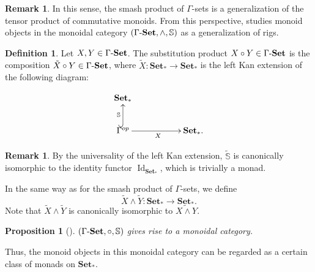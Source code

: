 \documentclass{article}
\numberwithin{equation}{section}
\newtheorem{prop}[thm]{Proposition}
\theoremstyle{definition}
\newtheorem{definition}[thm]{Definition}
\newtheorem{rem}[thm]{Remark}
\begin{document}
\begin{rem}In this sense, the smash product of $\Gamma$-sets is a generalization of the tensor product of commutative monoids.
From this perspective, \cite{CC} studies monoid objects in the monoidal category $(\Gamma \mathchar`-\mathbf{Set}, \wedge, \mathbb{S})$ as a generalization of rigs.
\end{rem}

\begin{definition}Let $X, Y\in\Gamma \mathchar`-\mathbf{Set}$. 
The substitution product $X\circ Y\in\Gamma \mathchar`-\mathbf{Set}$ is the composition $\tilde{X}\circ Y\in\Gamma \mathchar`-\mathbf{Set}$, where $\tilde{X}:\mathbf{Set}_*\to\mathbf{Set}_*$ is the left Kan extension of the following diagram:


\[
\xymatrix{
\mathbf{Set}_*&&\\
\Gamma^{op} \ar@{^{(}->}[u]^{\mathbb{S}} \ar[rr]_{X} &&\mathbf{Set}_*.
}\]

\end{definition}

\begin{rem}By the universality of the left Kan extension, $\tilde{\mathbb{S}}$ is canonically isomorphic to the identity functor $\operatorname{Id}_{\mathbf{Set}_*}$, which is trivially a monad.

In the same way as for the smash product of $\Gamma$-sets, we define 
\[\tilde{X}\wedge\tilde{Y}:\mathbf{Set}_*\to\mathbf{Set}_*.\]
Note that $\tilde{X}\wedge\tilde{Y}$ is canonically isomorphic to $\widetilde{X\wedge Y}$.
\end{rem}


\begin{prop}[\cite{Lydakis, CC}] $(\Gamma \mathchar`-\mathbf{Set}, \circ, \mathbb{S})$ gives rise to a monoidal category.
\end{prop}
Thus, the monoid objects in this monoidal category can be regarded as a certain class of monads on $\mathbf{Set}_*$.
\end{document}
